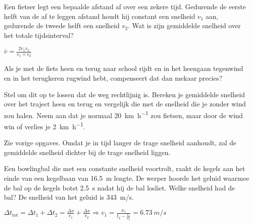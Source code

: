 \documentclass{ximera}
\begin{document}
\begin{exercise}
    Een fietser legt een bepaalde afstand af over een zekere tijd. Gedurende de eerste helft van de af te leggen afstand houdt hij constant een snelheid $v_1$ aan, gedurende de tweede helft een snelheid $v_2$. Wat is zijn gemiddelde snelheid over het totale tijdsinterval? 
\begin{oplossing}
  $\overline{v}=\frac{2v_1v_2}{v_1+v_2}$
\end{oplossing}
\end{exercise}

\begin{exercise}
    Als je met de fiets heen en terug naar school rijdt en in het heengaan tegenwind en in het terugkeren rugwind hebt, compenseert dat dan mekaar precies?

    Stel om dit op te lossen dat de weg rechtlijnig is. Bereken je gemiddelde snelheid over het traject heen en terug en vergelijk die met de snelheid die je zonder wind zou halen. Neem aan dat je normaal \SI{20}{\kilo\meter\per\hour} zou fietsen, maar door de wind win of verlies je \SI{2}{\kilo\meter\per\hour}.
    \begin{multipleChoice}
    \end{multipleChoice}
    \begin{feedback}
    Zie vorige opgaves. Omdat je in tijd langer de trage snelheid aanhoudt, zal de gemiddelde snelheid dichter bij de trage snelheid liggen. 
    \end{feedback}
\end{exercise}

\begin{exercise}
    Een bowlingbal die met een constante snelheid voortrolt, raakt de kegels aan het einde van een kegelbaan van \SI{16,5}{m} lengte. De werper hoorde het geluid waarmee de bal op de kegels botst \SI{2,5}{s} nadat hij de bal losliet. Welke snelheid had de bal? De snelheid van het geluid is \SI{343}{m/s}. 
    \begin{oplossing}
        $ \Delta t_{\text{tot}} = \Delta t_1 + \Delta t_2 = \frac{\Delta x}{v_1} + \frac{\Delta x}{v_2} \Rightarrow v_1=\frac{x_1}{t_2-\frac{x_1}{v_2}}=\SI{6,73}{m/s}$
    \end{oplossing}
\end{exercise}
\end{document}
